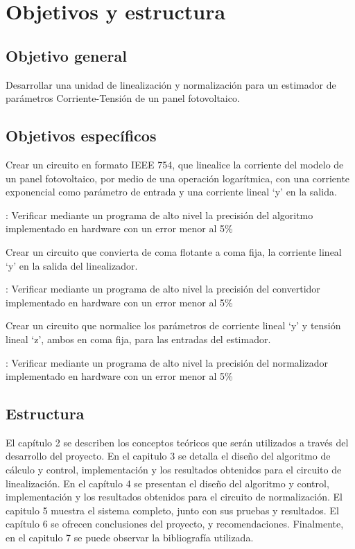 \section{Objetivos y estructura}

\subsection{Objetivo general}

Desarrollar una unidad de linealización y normalización para un estimador de parámetros Corriente-Tensión de un panel fotovoltaico.

\subsection{Objetivos específicos}

\begin{compactitem}
\item Crear un circuito en formato IEEE 754, que linealice la corriente del modelo de un panel fotovoltaico, por medio de una operación logarítmica, con una corriente exponencial como parámetro de entrada y una corriente lineal ‘y’ en la salida.

: Verificar mediante un programa de alto nivel la precisión del algoritmo implementado en hardware con un error menor al 5\%

\item Crear un circuito que convierta de coma flotante a coma fija, la corriente lineal ‘y’ en la salida del linealizador.

: Verificar mediante un programa de alto nivel la precisión del convertidor implementado en hardware con un error menor al 5\%

\item Crear un circuito que normalice los parámetros de corriente lineal ‘y’ y tensión lineal ‘z’, ambos en coma fija, para las entradas del estimador. 

: Verificar mediante un programa de alto nivel la precisión del normalizador implementado en hardware con un error menor al 5\%


\end{compactitem}

\subsection{Estructura}
El capítulo 2 se describen los conceptos teóricos que serán utilizados a través del desarrollo del proyecto. En el capitulo 3 se detalla el diseño del algoritmo de cálculo y control, implementación y los resultados obtenidos para el circuito de linealización. En el capítulo 4 se presentan el diseño del algoritmo y control, implementación y los resultados obtenidos para el circuito de normalización. El capitulo 5 muestra el sistema completo, junto con sus pruebas y resultados.  El capítulo 6 se ofrecen conclusiones del proyecto, y recomendaciones. Finalmente, en el capitulo 7 se puede observar la bibliografía utilizada. 




